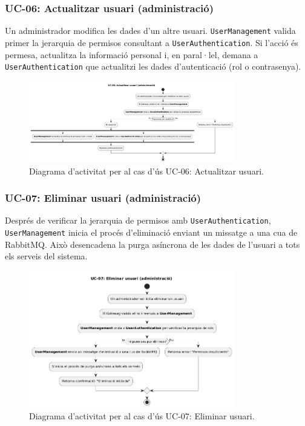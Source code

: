 \subsubsection{UC-06: Actualitzar usuari (administració)}
Un administrador modifica les dades d'un altre usuari. \texttt{UserManagement} valida primer la jerarquia de permisos consultant a \texttt{UserAuthentication}. Si l'acció és permesa, actualitza la informació personal i, en paral·lel, demana a \texttt{UserAuthentication} que actualitzi les dades d'autenticació (rol o contrasenya).

\begin{figure}[H]
    \centering
    \includegraphics[width=0.8\textwidth]{Figures/ad_UC06.png}
    \caption{Diagrama d'activitat per al cas d'ús UC-06: Actualitzar usuari.}
    \label{fig:ad_uc06_app}
\end{figure}

\subsubsection{UC-07: Eliminar usuari (administració)}
Després de verificar la jerarquia de permisos amb \texttt{UserAuthentication}, \texttt{UserManagement} inicia el procés d'eliminació enviant un missatge a una cua de RabbitMQ. Això desencadena la purga asíncrona de les dades de l'usuari a tots els serveis del sistema.

\begin{figure}[H]
    \centering
    \includegraphics[width=0.8\textwidth]{Figures/ad_UC07.png}
    \caption{Diagrama d'activitat per al cas d'ús UC-07: Eliminar usuari.}
    \label{fig:ad_uc07_app}
\end{figure}

